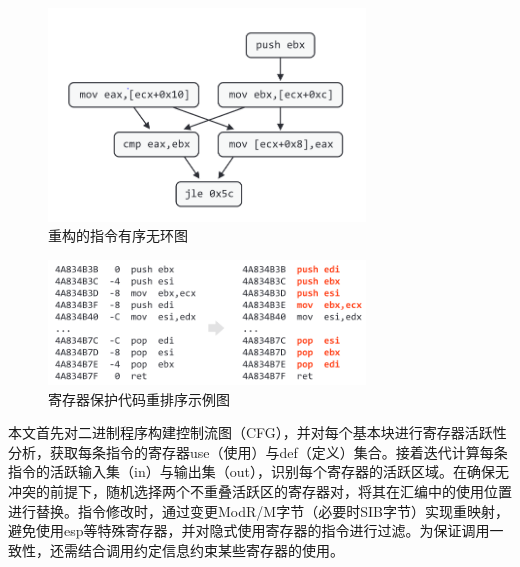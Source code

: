 \begin{enumerate}
\begin{figure}[hbt]
	\centering
	\includegraphics[width=0.75\textwidth]{figures/4.4}
	\caption{重构的指令有序无环图}\label{fig:4.4}
\end{figure}

\begin{figure}[hbt]
	\centering
	\includegraphics[width=0.75\textwidth]{figures/4.5}
	\caption{寄存器保护代码重排序示例图}\label{fig:4.5}
\end{figure}

本文首先对二进制程序构建控制流图（CFG），并对每个基本块进行寄存器活跃性分析，获取每条指令的寄存器use（使用）与def（定义）集合。接着迭代计算每条指令的活跃输入集（in）与输出集（out），识别每个寄存器的活跃区域。在确保无冲突的前提下，随机选择两个不重叠活跃区的寄存器对，将其在汇编中的使用位置进行替换。指令修改时，通过变更ModR/M字节（必要时SIB字节）实现重映射，避免使用esp等特殊寄存器，并对隐式使用寄存器的指令进行过滤。为保证调用一致性，还需结合调用约定信息约束某些寄存器的使用。



\end{enumerate}
